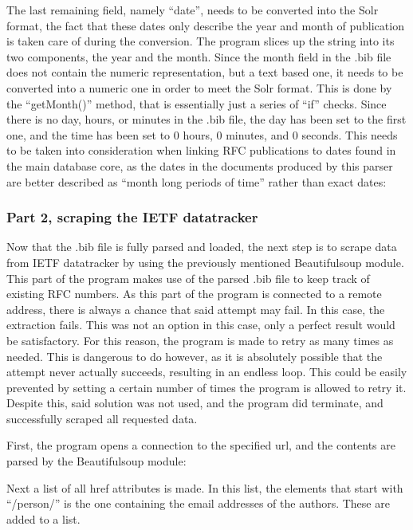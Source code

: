 \documentclass[a4paper,english]{report}
\begin{document}


The last remaining field, namely “date”, needs to be converted into the Solr format, the fact that these dates only describe the year and month of publication is taken care of during the conversion. The program slices up the string into its two components, the year and the month. Since the month field in the .bib file does not contain the numeric representation, but a text based one, it needs to be converted into a numeric one in order to meet the Solr format. This is done by the “getMonth()” method, that is essentially just a series of “if” checks. 
Since there is no day, hours, or minutes in the .bib file, the day has been set to the first one, and the time has been set to 0 hours, 0 minutes, and 0 seconds. This needs to be taken into consideration when linking RFC publications to dates found in the main database core, as the dates in the documents produced by this parser are better described as “month long periods of time” rather than exact dates:



\subsubsection{Part 2, scraping the IETF datatracker}

Now that the .bib file is fully parsed and loaded, the next step is to scrape data from IETF datatracker by using the previously mentioned Beautifulsoup module. 
This part of the program makes use of the parsed .bib file to keep track of existing RFC numbers.
As this part of the program is connected to a remote address, there is always a chance that said attempt may fail. In this case, the extraction fails. This was not an option in this case, only a perfect result would be satisfactory. For this reason, the program is made to retry as many times as needed. This is dangerous to do however, as it is absolutely possible that the attempt never actually succeeds, resulting in an endless loop. This could be easily prevented by setting a certain number of times the program is allowed to retry it. Despite this, said solution was not used, and the program did terminate, and successfully scraped all requested data.\\  
\smallskip

\smallskip
First, the program opens a connection to the specified url, and the contents are parsed by the Beautifulsoup module:  \\
\smallskip

\medskip
Next a list of all href attributes is made. In this list, the elements that start with “/person/” is the one containing the email addresses of the authors. These are added to a list.\\
\smallskip

\smallskip
\end{document}
